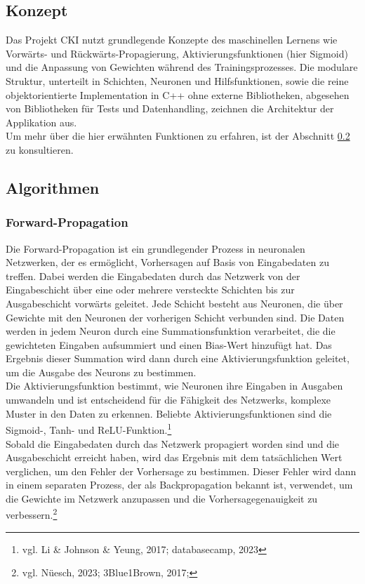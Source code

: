 \subsection{Konzept}
Das Projekt CKI nutzt grundlegende Konzepte des maschinellen Lernens wie Vorwärts- und Rückwärts-Propagierung, Aktivierungsfunktionen (hier Sigmoid) und die Anpassung von Gewichten während des Trainingsprozesses. Die modulare Struktur, unterteilt in Schichten, Neuronen und Hilfsfunktionen, sowie die reine objektorientierte Implementation in C++ ohne externe Bibliotheken, abgesehen von Bibliotheken für Tests und Datenhandling, zeichnen die Architektur der Applikation aus.
\\
Um mehr über die hier erwähnten Funktionen zu erfahren, ist der Abschnitt \ref{sec:RealAlgorithmen} zu konsultieren.

\subsection{Algorithmen}
\label{sec:RealAlgorithmen}
\subsubsection{ Forward-Propagation}
\label{sec:RealForwardPropagation}
Die Forward-Propagation ist ein grundlegender Prozess in neuronalen Netzwerken, der es ermöglicht, Vorhersagen auf Basis von Eingabedaten zu treffen. Dabei werden die Eingabedaten durch das Netzwerk von der Eingabeschicht über eine oder mehrere versteckte Schichten bis zur Ausgabeschicht vorwärts geleitet. Jede Schicht besteht aus Neuronen, die über Gewichte mit den Neuronen der vorherigen Schicht verbunden sind. Die Daten werden in jedem Neuron durch eine Summationsfunktion verarbeitet, die die gewichteten Eingaben aufsummiert und einen Bias-Wert hinzufügt hat. Das Ergebnis dieser Summation wird dann durch eine Aktivierungsfunktion geleitet, um die Ausgabe des Neurons zu bestimmen.
\\
Die Aktivierungsfunktion bestimmt, wie Neuronen ihre Eingaben in Ausgaben umwandeln und ist entscheidend für die Fähigkeit des Netzwerks, komplexe Muster in den Daten zu erkennen. Beliebte Aktivierungsfunktionen sind die Sigmoid-, Tanh- und ReLU-Funktion.\footnote{vgl. Li \& Johnson \& Yeung, 2017; databasecamp, 2023}
\\
Sobald die Eingabedaten durch das Netzwerk propagiert worden sind und die Ausgabeschicht erreicht haben, wird das Ergebnis mit dem tatsächlichen Wert verglichen, um den Fehler der Vorhersage zu bestimmen. Dieser Fehler wird dann in einem separaten Prozess, der als Backpropagation bekannt ist, verwendet, um die Gewichte im Netzwerk anzupassen und die Vorhersagegenauigkeit zu verbessern.\footnote{vgl. Nüesch, 2023;  3Blue1Brown, 2017;}



